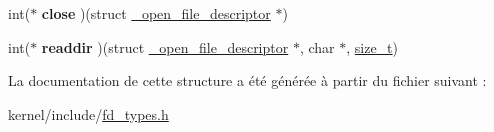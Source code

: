 \begin{DoxyCompactItemize}
\item 
\hypertarget{struct__open__file__operations__t_a187ebd3d665fde0a486bd7f5d3001f00}{int($\ast$ {\bfseries close} )(struct \hyperlink{struct__open__file__descriptor}{\-\_\-open\-\_\-file\-\_\-descriptor} $\ast$)}\label{struct__open__file__operations__t_a187ebd3d665fde0a486bd7f5d3001f00}

\item 
\hypertarget{struct__open__file__operations__t_a7cdb4947735c5559610fb8be2472791d}{int($\ast$ {\bfseries readdir} )(struct \hyperlink{struct__open__file__descriptor}{\-\_\-open\-\_\-file\-\_\-descriptor} $\ast$, char $\ast$, \hyperlink{types_8h_a29d85914ddff32967d85ada69854206d}{size\-\_\-t})}\label{struct__open__file__operations__t_a7cdb4947735c5559610fb8be2472791d}

\end{DoxyCompactItemize}


\-La documentation de cette structure a été générée à partir du fichier suivant \-:\begin{DoxyCompactItemize}
\item 
kernel/include/\hyperlink{fd__types_8h}{fd\-\_\-types.\-h}\end{DoxyCompactItemize}

